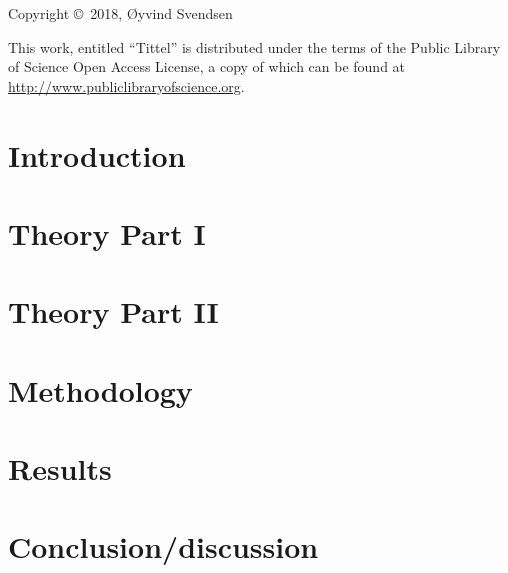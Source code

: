 \documentclass[a4, 12pt, draft]{book}
\title{\mintittel}
\author{\O yvind Svendsen}
\date{01.06.18}
\newcommand{\mintittel}{Tittel}
\begin{document}

\vspace*{18cm}
\noindent Copyright \copyright$\,$ 2018, \O yvind Svendsen
\vspace{4mm}

\noindent This work, entitled ``\mintittel'' is distributed under the
terms of the Public Library of Science Open Access License, a copy of which can be found at \url{http://www.publiclibraryofscience.org}. 

%
%

\chapter{Introduction}


\chapter{Theory Part I  }





\chapter{Theory Part II }



\chapter{Methodology}

%
%

\chapter{Results}


\chapter{Conclusion/discussion}



\end{document}
